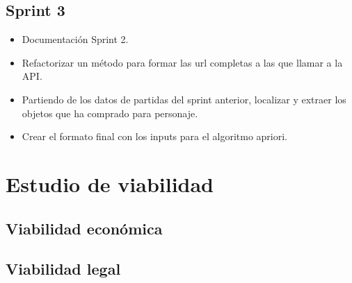\subsection{Sprint 3}

\begin{itemize}
    \item Documentación Sprint 2.
    \item Refactorizar un método para formar las url completas a las que llamar a la API.
    \item Partiendo de los datos de partidas del sprint anterior, localizar y extraer los objetos que ha comprado para personaje.
    \item Crear el formato final con los inputs para el algoritmo apriori.
\end{itemize}

\section{Estudio de viabilidad}

\subsection{Viabilidad económica}

\subsection{Viabilidad legal}


